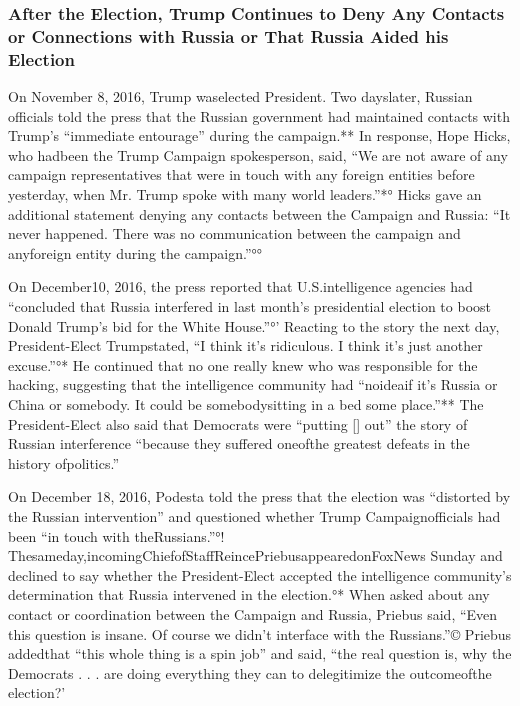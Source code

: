 \subsubsection{After the Election, Trump Continues to Deny Any Contacts or Connections with Russia or That Russia Aided his Election}

On November 8, 2016, Trump waselected President.
Two dayslater, Russian officials told the press that the Russian government had maintained contacts with Trump’s “immediate entourage” during the campaign.**
In response, Hope Hicks, who hadbeen the Trump Campaign spokesperson, said, “We are not aware of any campaign representatives that were in touch with any foreign entities before yesterday, when Mr. Trump spoke with many world leaders.”*°
Hicks gave an additional statement denying any contacts between the Campaign and Russia: “It never happened.
There was no communication between the campaign and anyforeign entity during the campaign.”°°

On December10, 2016, the press reported that U.S.intelligence agencies had “concluded that Russia interfered in last month’s presidential election to boost Donald Trump’s bid for the White House.”°’
Reacting to the story the next day, President-Elect Trumpstated, “I think it’s ridiculous.
I think it’s just another excuse.”°*
He continued that no one really knew who was responsible for the hacking, suggesting that the intelligence community had “noideaif it’s Russia or China or somebody.
It could be somebodysitting in a bed some place.”**
The President-Elect also said that Democrats were “putting [] out” the story of Russian interference “because they suffered oneofthe greatest defeats in the history ofpolitics.”

On December 18, 2016, Podesta told the press that the election was “distorted by the Russian intervention” and questioned whether Trump Campaignofficials had been “in touch with theRussians.”°!
Thesameday,incomingChiefofStaffReincePriebusappearedonFoxNews Sunday and declined to say whether the President-Elect accepted the intelligence community’s determination that Russia intervened in the election.°*
When asked about any contact or coordination between the Campaign and Russia, Priebus said, “Even this question is insane.
Of course we didn’t interface with the Russians.”©
Priebus addedthat “this whole thing is a spin job” and said, “the real question is, why the Democrats . . . are doing everything they can to delegitimize the outcomeofthe election?’

